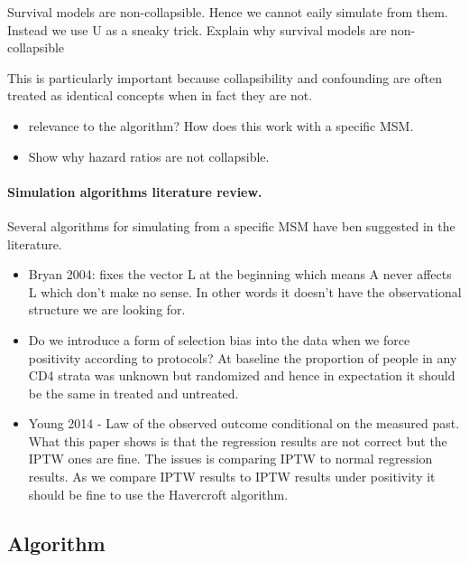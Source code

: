 \documentclass[11pt]{article}
\providecommand{\tightlist}{%
      \setlength{\itemsep}{0pt}\setlength{\parskip}{0pt}}
\begin{document}
Survival models are non-collapsible. Hence we cannot eaily simulate from
them. Instead we use U as a sneaky trick. Explain why survival models
are non-collapsible

This is particularly important because collapsibility and confounding
are often treated as identical concepts when in fact they are not.
\citet{Greenland1999}

\begin{itemize}
\tightlist
\item
  relevance to the algorithm? How does this work with a specific MSM.
\item
  Show why hazard ratios are not collapsible.
\end{itemize}

\paragraph{Simulation algorithms literature
review.}\label{simulation-algorithms-literature-review.}

Several algorithms for simulating from a specific MSM have ben suggested
in the literature.

\citet{Havercroft2012} \citet{Bryan2004} \citet{Westreich2012}
\citet{Young2014}

\begin{itemize}
\tightlist
\item
  Bryan 2004: fixes the vector L at the beginning which means A never
  affects L which don't make no sense. In other words it doesn't have
  the observational structure we are looking for.
\item
  Do we introduce a form of selection bias into the data when we force
  positivity according to protocols? At baseline the proportion of
  people in any CD4 strata was unknown but randomized and hence in
  expectation it should be the same in treated and untreated.
\item
  Young 2014 - Law of the observed outcome conditional on the measured
  past. What this paper shows is that the regression results are not
  correct but the IPTW ones are fine. The issues is comparing IPTW to
  normal regression results. As we compare IPTW results to IPTW results
  under positivity it should be fine to use the Havercroft algorithm.
\end{itemize}

\subsection{Algorithm}\label{algorithm}
\end{document}
